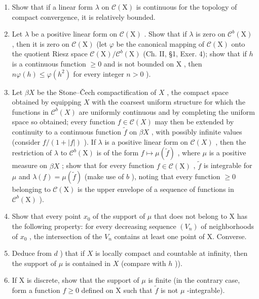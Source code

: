 \begin{enumerate}
\def\labelenumi{\alph{enumi})}
\item
  Show that if a linear form \(\lambda\) on \(\mathcal{C}(\mathrm{X})\) is continuous for the topology of compact convergence, it is relatively bounded.
\item
  Let \(\lambda\) be a positive linear form on \(\mathcal{C}(\mathrm{X})\) . Show that if \(\lambda\) is zero on \(\mathcal{C}^b (\mathrm{X})\) , then it is zero on \(\mathcal{C}(\mathrm{X})\) (let \(\varphi\) be the canonical mapping of \(\mathcal{C}(\mathrm{X})\) onto the quotient Riesz space \(\mathcal{C}(\mathrm{X}) / \mathcal{C}^b (\mathrm{X})\) (Ch. II, §1, Exer. 4); show that if \(h\) is a continuous function \(\geqslant 0\) and is not bounded on \(\mathrm{X}\) , then \(n\varphi (h)\leqslant \varphi (h^{2})\) for every integer \(n > 0\) ).
\item
  Let \(\beta X\) be the Stone--Čech compactification of \(X\) , the compact space obtained by equipping \(X\) with the coarsest uniform structure for which the functions in \(\mathcal{C}^b(X)\) are uniformly continuous and by completing the uniform space so obtained; every function \(f \in \mathcal{C}(X)\) may then be extended by continuity to a continuous function \(\widetilde{f}\) on \(\beta X\) , with possibly infinite values (consider \(f/(1 + |f|)\) ). If \(\lambda\) is a positive linear form on \(\mathcal{C}(X)\) , then the restriction of \(\lambda\) to \(\mathcal{C}^b (\mathrm{X})\) is of the form \(f\mapsto \mu (\widetilde{f})\) , where \(\mu\) is a positive measure on \(\beta X\) ; show that for every function \(f\in \mathcal{C}(\mathrm{X})\) , \(\widetilde{f}\) is integrable for \(\mu\) and \(\lambda (f) = \mu (\widetilde{f})\) (make use of \(b\) ), noting that every function \(\geqslant 0\) belonging to \(\mathcal{C}(\mathrm{X})\) is the upper envelope of a sequence of functions in \(\mathcal{C}^b (\mathrm{X})\) ).
\item
  Show that every point \(x_{0}\) of the support of \(\mu\) that does not belong to X has the following property: for every decreasing sequence \((V_{n})\) of neighborhoods of \(x_{0}\) , the intersection of the \(V_{n}\) contains at least one point of X. Converse.
\item
  Deduce from \(d\) ) that if \(X\) is locally compact and countable at infinity, then the support of \(\mu\) is contained in \(X\) (compare with \(h\) )).
\item
  If X is discrete, show that the support of \(\mu\) is finite (in the contrary case, form a function \(f \geqslant 0\) defined on X such that \(\widetilde{f}\) is not \(\mu\) -integrable).

\end{enumerate}

